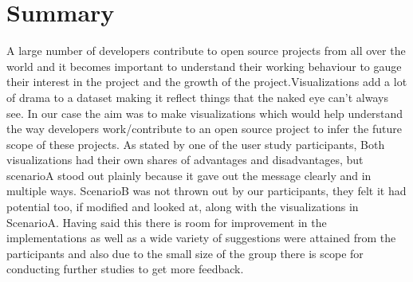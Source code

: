 \documentclass[seploa]{beavtex}
\begin{document}
\chapter{Summary}
A large number of developers contribute to open source projects from all over the world and it becomes important to understand their working behaviour to gauge their interest in the project and the growth of the project.Visualizations add a lot of drama to a dataset making it reflect things that the naked eye can't always see. In our case the aim was to make visualizations which would help understand the way developers work/contribute to an open source project to infer the future scope of these projects. As stated by one of the user study participants,  Both visualizations had their own shares of advantages and disadvantages, but scenarioA stood out plainly because it gave out the message clearly and in multiple ways. ScenarioB was not thrown out by our participants, they felt it had potential too, if modified and looked at, along with the visualizations in ScenarioA. Having said this there is room for improvement in the implementations as well as a wide variety of suggestions were attained from the participants and also due to the small size of the group there is scope for conducting further studies to get more feedback. 



\end{document}
